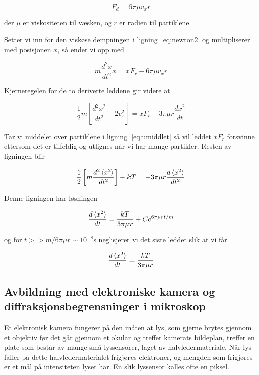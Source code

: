 \documentclass[a4paper,11pt, twocolumn]{article}
\begin{document}
\begin{equation}
	F_d = 6\pi\mu v_x r
	\label{eq:stokes}
\end{equation}

der $\mu$ er viskositeten til væsken, og $r$ er radien til partiklene. 

Setter vi inn for den viskøse dempningen i ligning~\eqref{eq:newton2} og multipliserer med posisjonen $x$, så ender vi opp med

\begin{equation}
	m\frac{d^2x}{dt^2}x={xF_r-6\pi\mu v_xr}	
\end{equation}

Kjerneregelen for de to deriverte leddene  gir videre at

\begin{equation}
	\frac{1}{2}m\left[ \frac{d^2x^2}{dt^2}	-2v_x^2 \right ] = xF_r - 3\pi\mu r\frac{dx^2}{dt}
	\label{eq:umiddlet}
\end{equation}

Tar vi middelet over partiklene i ligning~\eqref{eq:umiddlet} så vil leddet $xF_r$ forsvinne ettersom det er tilfeldig og utlignes når vi har mange partikler. Resten av ligningen blir

\begin{equation}
	\frac{1}{2}\left[ m\frac{d^2\braket{x^2}}{dt^2}	 \right]-kT = -3\pi\mu r \frac{d\braket{x^2}}{dt^2}
	\label{:eq:ensamble}
\end{equation}

Denne ligningen har løsningen

\begin{equation}
	\frac{d\braket{x^2}}{dt}=\frac{kT}{3\pi\mu r}+Ce^{6\pi\mu r t/m}
	\label{eq:Langevin}
\end{equation}

og for $t>>m/6\pi\mu r\sim 10^{-8}$s neglisjerer vi det siste leddet slik at vi får 

\begin{equation}
	\frac{d\braket{x^2}}{dt}=\frac{kT}{3\pi\mu r}
	\label{eq:LangevinEnkel}
\end{equation}
\subsection{Avbildning med elektroniske kamera og diffraksjonsbegrensninger i mikroskop}
\label{sec:avbildning}
Et elektronisk kamera fungerer på den måten at lys, som gjerne brytes gjennom et objektiv før det går gjennom et okular og treffer kamerats bildeplan, treffer en plate som består av mange små lyssensorer, laget av halvledermateriale. Når lys faller på dette halvledermaterialet frigjøres elektroner, og mengden som frigjøres er et mål på intensiteten lyset har. En slik lyssensor kalles ofte en piksel. 
\end{document}
